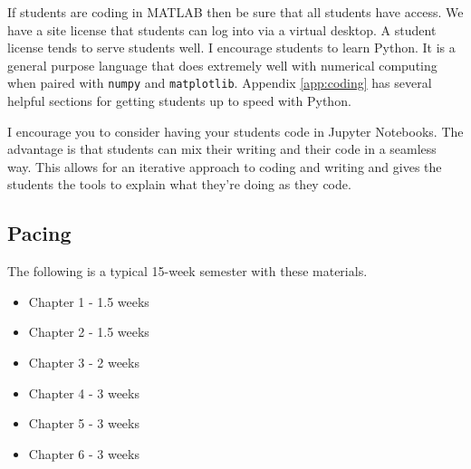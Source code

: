 \ifnum{} If students are coding in MATLAB then be sure that all students have
access.  We have a site license that students can log into via a virtual desktop.  A
student license tends to serve students well. \fi
\ifnum{} I encourage students to learn Python.  It is a general purpose language
that does extremely well with numerical computing when paired with \texttt{numpy} and
\texttt{matplotlib}.  Appendix \ref{app:coding} has several helpful sections for getting
students up to speed with Python.

I encourage you to consider having your students code in Jupyter Notebooks.  The advantage
is that students can mix their writing and their code in a seamless way.  This allows for
an iterative approach to coding and writing and gives the students the tools to explain
what they're doing as they code.
\fi

\subsection{Pacing}
The following is a typical 15-week semester with these materials.
\begin{itemize}
    \item Chapter 1 - 1.5 weeks
    \item Chapter 2 - 1.5 weeks
    \item Chapter 3 - 2 weeks
    \item Chapter 4 - 3 weeks
    \item Chapter 5 - 3 weeks
    \item Chapter 6 - 3 weeks
\end{itemize}

